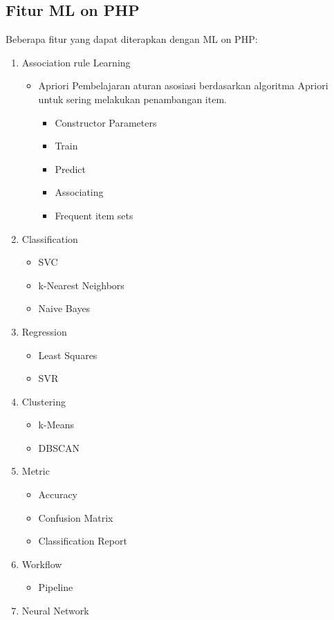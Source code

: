 \subsection{Fitur ML on PHP}
Beberapa fitur yang dapat diterapkan dengan ML on PHP:
\begin{enumerate}
\item Association rule Learning
\begin{itemize}
\item Apriori
Pembelajaran aturan asosiasi berdasarkan algoritma Apriori untuk sering melakukan penambangan item.
\begin{itemize}
	\item Constructor Parameters
	\item Train
	\item Predict
	\item Associating
	\item Frequent item sets
\end{itemize}
\end{itemize}
\item Classification
\begin{itemize}
\item SVC
\item k-Nearest Neighbors
\item Naive Bayes
\end{itemize}
\item Regression
\begin{itemize}
\item Least Squares
\item SVR
\end{itemize}
\item Clustering
\begin{itemize}
\item k-Means
\item DBSCAN
\end{itemize}
\item Metric
\begin{itemize}
\item Accuracy
\item Confusion Matrix
\item  Classification Report
\end{itemize}
\item Workflow
\begin{itemize}
\item  Pipeline
\end{itemize}
\item Neural Network
\begin{itemize}

\end{itemize}
\end{enumerate}
